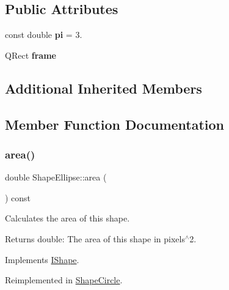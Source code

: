 \subsection*{Public Attributes}
\begin{DoxyCompactItemize}
\item 
\mbox{\label{class_shape_ellipse_a8ee638d167c341015a7f0f82b7a8debb}} 
const double {\bfseries pi} = 3.
\item 
\mbox{\label{class_shape_ellipse_ac9feb0571e6f658866ab142643230081}} 
Q\+Rect {\bfseries frame}
\end{DoxyCompactItemize}
\subsection*{Additional Inherited Members}


\subsection{Member Function Documentation}
\mbox{\label{class_shape_ellipse_a08287b301b7501eb941805eaf85fc00c}} 
\subsubsection{\texorpdfstring{area()}{area()}}
{\footnotesize\ttfamily double Shape\+Ellipse\+::area (\begin{DoxyParamCaption}{ }\end{DoxyParamCaption}) const\hspace{0.3cm}{\ttfamily [virtual]}}



Calculates the area of this shape. 

\begin{DoxyReturn}{Returns}
double\+: The area of this shape in pixels$^\wedge$2. 
\end{DoxyReturn}


Implements \mbox{\hyperlink{class_i_shape_aed742a160acdd13c9cfdeb16e605afea}{I\+Shape}}.



Reimplemented in \mbox{\hyperlink{class_shape_circle_aebc30fb4ad7165778deb75f0bd2d69bd}{Shape\+Circle}}.

